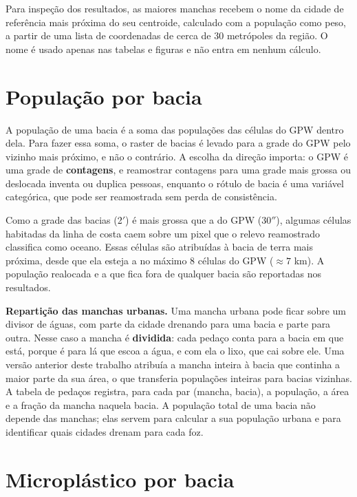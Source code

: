 Para inspeção dos resultados, as maiores manchas recebem o nome da cidade de referência mais próxima do seu centroide, calculado com a população como peso, a partir de uma lista de coordenadas de cerca de 30 metrópoles da região. O nome é usado apenas nas tabelas e figuras e não entra em nenhum cálculo.

\section{População por bacia}
\label{sec:met-populacao}

A população de uma bacia é a soma das populações das células do GPW dentro dela. Para fazer essa soma, o raster de bacias é levado para a grade do GPW pelo vizinho mais próximo, e não o contrário. A escolha da direção importa: o GPW é uma grade de \textbf{contagens}, e reamostrar contagens para uma grade mais grossa ou deslocada inventa ou duplica pessoas, enquanto o rótulo de bacia é uma variável categórica, que pode ser reamostrada sem perda de consistência.

Como a grade das bacias (2$'$) é mais grossa que a do GPW (30$''$), algumas células habitadas da linha de costa caem sobre um pixel que o relevo reamostrado classifica como oceano. Essas células são atribuídas à bacia de terra mais próxima, desde que ela esteja a no máximo 8 células do GPW ($\approx 7$ km). A população realocada e a que fica fora de qualquer bacia são reportadas nos resultados.

\textbf{Repartição das manchas urbanas.} Uma mancha urbana pode ficar sobre um divisor de águas, com parte da cidade drenando para uma bacia e parte para outra. Nesse caso a mancha é \textbf{dividida}: cada pedaço conta para a bacia em que está, porque é para lá que escoa a água, e com ela o lixo, que cai sobre ele. Uma versão anterior deste trabalho atribuía a mancha inteira à bacia que continha a maior parte da sua área, o que transferia populações inteiras para bacias vizinhas. A tabela de pedaços registra, para cada par (mancha, bacia), a população, a área e a fração da mancha naquela bacia. A população total de uma bacia não depende das manchas; elas servem para calcular a sua população urbana e para identificar quais cidades drenam para cada foz.

\section{Microplástico por bacia}
\label{sec:met-plastico}

